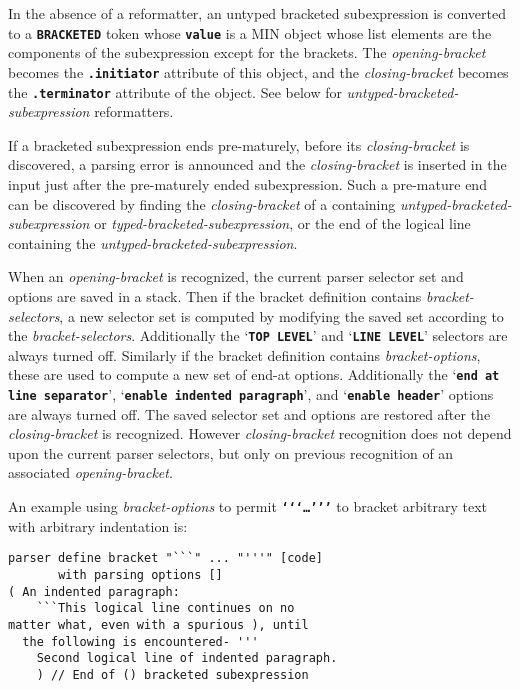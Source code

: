 \documentclass[12pt]{article}
\newcommand{\TT}[1]{{\tt \bfseries #1}}
\newenvironment{indpar}[1][0.3in]%
	{\begin{list}{}%
		     {\setlength{\itemsep}{0in}%
		      \setlength{\topsep}{0in}%
		      \setlength{\parsep}{1ex}%
		      \setlength{\labelwidth}{#1}%
		      \setlength{\leftmargin}{#1}%
		      \addtolength{\leftmargin}{\labelsep}}%
	 \item}%
	{\end{list}}
\begin{document}
In the absence of a reformatter,
an untyped bracketed subexpression is converted to a \TT{BRACKETED}
token whose \TT{value} is a
MIN object whose list elements are the components of the
subexpression except for the brackets.  The
{\em opening-bracket} becomes the \TT{.initiator}
attribute of this object, and the {\em closing-bracket}
becomes the \TT{.terminator} attribute of the object.
See below for {\em untyped-bracketed-subexpression} reformatters.

If a bracketed subexpression ends pre-maturely, before
its {\em closing-bracket} is discovered, a parsing error is
announced and the {\em closing-bracket} is inserted in the input
just after the pre-maturely ended subexpression.  Such a pre-mature end can be
discovered by finding the {\em closing-bracket} of a containing
{\em untyped-bracketed-subexpression} or {\em typed-bracketed-subexpression},
or the end of the logical line
containing the {\em untyped-bracketed-subexpression}.

When an {\em opening-bracket} is recognized, the current parser
selector set and options are saved in a stack.  Then if the
bracket definition contains {\em bracket-selectors},
a new selector set is computed by modifying the saved set
according to the {\em bracket-selectors}.  Additionally
the `\TT{TOP LEVEL}' and `\TT{LINE LEVEL}' selectors are always turned off.
Similarly if the bracket definition contains {\em bracket-options},
these are used to compute a new set of end-at options.
Additionally the `\TT{end at line separator}',
`\TT{enable indented paragraph}', and `\TT{enable header}' options
are always turned off.
The saved selector set and options are restored after the {\em closing-bracket}
is recognized.  However {\em closing-bracket}
recognition does not depend
upon the current parser selectors, but only on previous recognition
of an associated {\em opening-bracket}.

An example using {\em bracket-options} to permit
\TT{`{}`{}`\ldots'{}'{}'}
to bracket arbitrary text with arbitrary indentation is:
\begin{indpar}\begin{verbatim}
parser define bracket "```" ... "'''" [code]
       with parsing options []
( An indented paragraph:
    ```This logical line continues on no
matter what, even with a spurious ), until
  the following is encountered- '''
    Second logical line of indented paragraph.
    ) // End of () bracketed subexpression
\end{verbatim}\end{indpar}
\end{document}
